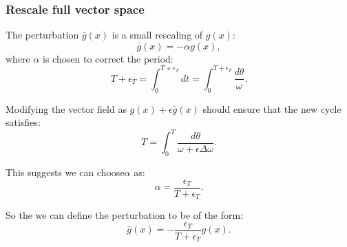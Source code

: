 \documentclass{article}
\theoremstyle{definition} \newtheorem{definition}{Definition}
\theoremstyle{remark} \newtheorem{remark}{Remark}
\newcommand{\boa}{\operatorname{BoA}}
\newcounter{ct}
\begin{document}

%
%
%

\subsubsection{Rescale full vector space}\label{sec:rescale_period}
The perturbation \( \bar{g}(x) \) is a small rescaling of \( g(x) \):
\[
\bar{g}(x) = -\alpha g(x),
\]
where \( \alpha \) is chosen to correct the period:
\[
T + \epsilon_T = \int_0^{T+\epsilon_T} dt = \int_0^{T+\epsilon_T} \frac{d\theta}{\omega}.
\]

Modifying the vector field as \( g(x) + \epsilon \bar{g}(x) \) should ensure that the new cycle satisfies:
\[
T = \int_0^T \frac{d\theta}{\omega + \epsilon \Delta \omega}.
\]

This suggests we can  choose\( \alpha \) as:
\[
\alpha = \frac{\epsilon_T}{T + \epsilon_T}.
\]

So the we can define the perturbation to be of the form:
\[
\bar{g}(x) = -\frac{\epsilon_T}{T + \epsilon_T} g(x).
\]
\end{document}
